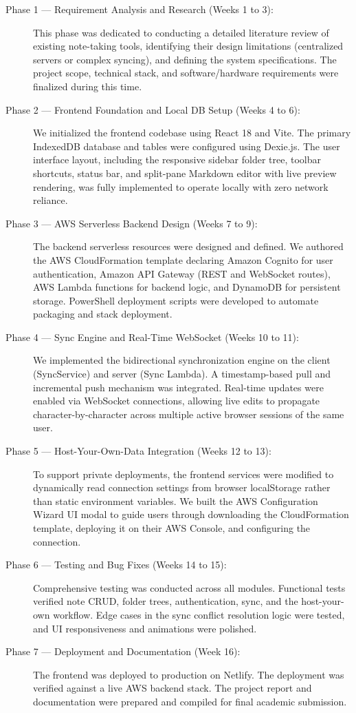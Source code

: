 \documentclass[12pt, a4paper, oneside]{report}
\begin{document}
\begin{description}
    \item[Phase 1 — Requirement Analysis and Research (Weeks 1 to 3):] This phase was dedicated to conducting a detailed literature review of existing note-taking tools, identifying their design limitations (centralized servers or complex syncing), and defining the system specifications. The project scope, technical stack, and software/hardware requirements were finalized during this time.
    \item[Phase 2 — Frontend Foundation and Local DB Setup (Weeks 4 to 6):] We initialized the frontend codebase using React 18 and Vite. The primary IndexedDB database and tables were configured using Dexie.js. The user interface layout, including the responsive sidebar folder tree, toolbar shortcuts, status bar, and split-pane Markdown editor with live preview rendering, was fully implemented to operate locally with zero network reliance.
    \item[Phase 3 — AWS Serverless Backend Design (Weeks 7 to 9):] The backend serverless resources were designed and defined. We authored the AWS CloudFormation template declaring Amazon Cognito for user authentication, Amazon API Gateway (REST and WebSocket routes), AWS Lambda functions for backend logic, and DynamoDB for persistent storage. PowerShell deployment scripts were developed to automate packaging and stack deployment.
    \item[Phase 4 — Sync Engine and Real-Time WebSocket (Weeks 10 to 11):] We implemented the bidirectional synchronization engine on the client (SyncService) and server (Sync Lambda). A timestamp-based pull and incremental push mechanism was integrated. Real-time updates were enabled via WebSocket connections, allowing live edits to propagate character-by-character across multiple active browser sessions of the same user.
    \item[Phase 5 — Host-Your-Own-Data Integration (Weeks 12 to 13):] To support private deployments, the frontend services were modified to dynamically read connection settings from browser localStorage rather than static environment variables. We built the AWS Configuration Wizard UI modal to guide users through downloading the CloudFormation template, deploying it on their AWS Console, and configuring the connection.
    \item[Phase 6 — Testing and Bug Fixes (Weeks 14 to 15):] Comprehensive testing was conducted across all modules. Functional tests verified note CRUD, folder trees, authentication, sync, and the host-your-own workflow. Edge cases in the sync conflict resolution logic were tested, and UI responsiveness and animations were polished.
    \item[Phase 7 — Deployment and Documentation (Week 16):] The frontend was deployed to production on Netlify. The deployment was verified against a live AWS backend stack. The project report and documentation were prepared and compiled for final academic submission.
\end{description}
\end{document}
